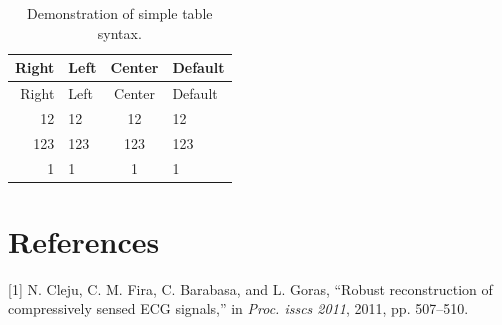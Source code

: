 \documentclass[conference,a4paper]{IEEEtran}
\begin{document}
\hypertarget{tbl:simple}{}
\begin{longtable}[]{@{}rlcl@{}}
\caption{\label{tbl:simple}Demonstration of simple table syntax.
}\tabularnewline
\toprule
Right & Left & Center & Default\tabularnewline
\midrule
\endfirsthead
\toprule
Right & Left & Center & Default\tabularnewline
\midrule
\endhead
12 & 12 & 12 & 12\tabularnewline
123 & 123 & 123 & 123\tabularnewline
1 & 1 & 1 & 1\tabularnewline
\bottomrule
\end{longtable}

\section*{References}\label{references}

\hypertarget{refs}{}
\hypertarget{ref-Cleju2011ISSCS}{}
{[}1{]} N. Cleju, C. M. Fira, C. Barabasa, and L. Goras, ``Robust
reconstruction of compressively sensed ECG signals,'' in \emph{Proc.
isscs 2011}, 2011, pp. 507--510.

%
%
\end{document}
